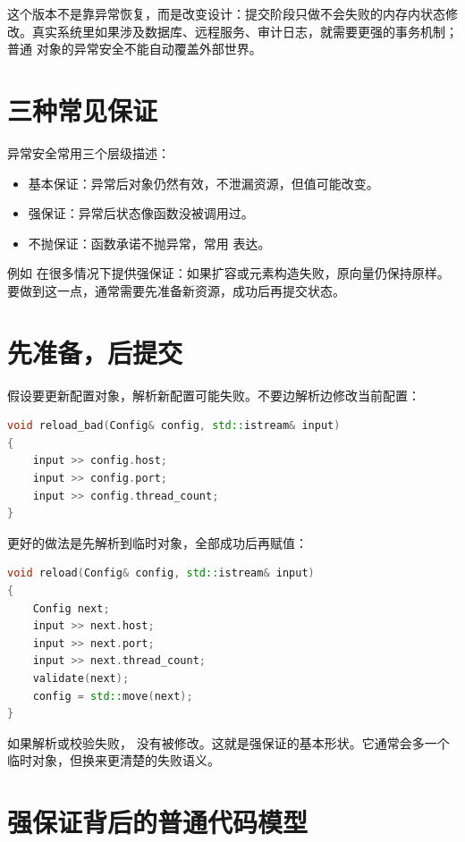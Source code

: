 这个版本不是靠异常恢复，而是改变设计：提交阶段只做不会失败的内存内状态修改。真实系统里如果涉及数据库、远程服务、审计日志，就需要更强的事务机制；普通 \cpp 对象的异常安全不能自动覆盖外部世界。

\section{三种常见保证}

异常安全常用三个层级描述：

\begin{itemize}
  \item 基本保证：异常后对象仍然有效，不泄漏资源，但值可能改变。
  \item 强保证：异常后状态像函数没被调用过。
  \item 不抛保证：函数承诺不抛异常，常用  表达。
\end{itemize}

例如  在很多情况下提供强保证：如果扩容或元素构造失败，原向量仍保持原样。要做到这一点，通常需要先准备新资源，成功后再提交状态。

\section{先准备，后提交}

假设要更新配置对象，解析新配置可能失败。不要边解析边修改当前配置：

\begin{lstlisting}[language=C++,caption={边解析边修改会留下半更新状态}]
void reload_bad(Config& config, std::istream& input)
{
    input >> config.host;
    input >> config.port;
    input >> config.thread_count;
}
\end{lstlisting}

更好的做法是先解析到临时对象，全部成功后再赋值：

\begin{lstlisting}[language=C++,caption={先构造临时配置再提交}]
void reload(Config& config, std::istream& input)
{
    Config next;
    input >> next.host;
    input >> next.port;
    input >> next.thread_count;
    validate(next);
    config = std::move(next);
}
\end{lstlisting}

如果解析或校验失败， 没有被修改。这就是强保证的基本形状。它通常会多一个临时对象，但换来更清楚的失败语义。

\section{强保证背后的普通代码模型}

